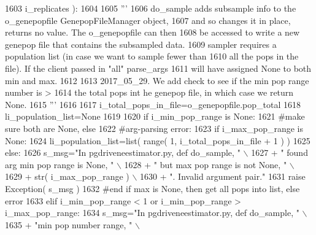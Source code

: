 \begin{DoxyCode}
1603                 i\_replicates ):
1604 
1605     \textcolor{stringliteral}{'''}
1606 \textcolor{stringliteral}{    do\_sample adds subsample info to the o\_genepopfile GenepopFileManager object,}
1607 \textcolor{stringliteral}{    and so changes it in place, returns no value.  The o\_genepopfile can then}
1608 \textcolor{stringliteral}{    be accessed to write a new genepop file that contains the subsampled data.}
1609 \textcolor{stringliteral}{    sampler requires a population list (in case we want to sample fewer than}
1610 \textcolor{stringliteral}{    all the pops in the file). If the client passed in "all" parse\_args}
1611 \textcolor{stringliteral}{    will have assigned None to both min and max.}
1612 \textcolor{stringliteral}{}
1613 \textcolor{stringliteral}{    2017\_05\_29.  We add check to see if the min pop range number is >}
1614 \textcolor{stringliteral}{    the total pops int he genepop file, in which case we return None.}
1615 \textcolor{stringliteral}{    '''}
1616 
1617     i\_total\_pops\_in\_file=o\_genepopfile.pop\_total
1618     li\_population\_list=\textcolor{keywordtype}{None}
1619 
1620     \textcolor{keywordflow}{if} i\_min\_pop\_range \textcolor{keywordflow}{is} \textcolor{keywordtype}{None}:
1621         \textcolor{comment}{#make sure both are None, else}
1622         \textcolor{comment}{#arg-parsing error:}
1623         \textcolor{keywordflow}{if} i\_max\_pop\_range \textcolor{keywordflow}{is} \textcolor{keywordtype}{None}:
1624             li\_population\_list=list( range( 1, i\_total\_pops\_in\_file + 1 ) )
1625         \textcolor{keywordflow}{else}:
1626             s\_msg=\textcolor{stringliteral}{"In pgdriveneestimator.py, def do\_sample, "} \(\backslash\)
1627                         + \textcolor{stringliteral}{" found arg min pop range is None, "} \(\backslash\)
1628                         + \textcolor{stringliteral}{" but max pop range is not None, "} \(\backslash\)
1629                         + str( i\_max\_pop\_range ) \(\backslash\)
1630                         + \textcolor{stringliteral}{".  Invalid argument pair."}
1631             \textcolor{keywordflow}{raise} Exception( s\_msg )
1632         \textcolor{comment}{#end if max is None, then get all pops into list, else error}
1633     \textcolor{keywordflow}{elif} i\_min\_pop\_range < 1 \textcolor{keywordflow}{or} i\_min\_pop\_range > i\_max\_pop\_range:
1634             s\_msg=\textcolor{stringliteral}{"In pgdriveneestimator.py, def do\_sample, "} \(\backslash\)
1635                         + \textcolor{stringliteral}{"min pop number range, "} \(\backslash\)

\end{DoxyCode}
